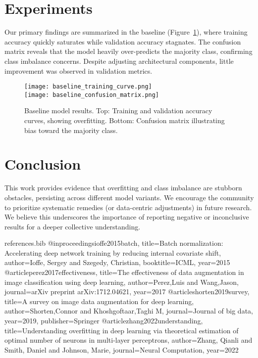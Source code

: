\documentclass{article}
\begin{document}
\section{Experiments}
Our primary findings are summarized in the baseline (Figure~\ref{fig:baseline}), where training accuracy quickly saturates while validation accuracy stagnates.
The confusion matrix reveals that the model heavily over-predicts the majority class, confirming class imbalance concerns.
Despite adjusting architectural components, little improvement was observed in validation metrics.

\begin{figure}[t]
  \centering
  \texttt{[image: baseline\_training\_curve.png]}\\
  \texttt{[image: baseline\_confusion\_matrix.png]}
  \caption{Baseline model results. Top: Training and validation accuracy curves, showing overfitting. Bottom: Confusion matrix illustrating bias toward the majority class.}
  \label{fig:baseline}
\end{figure}

\section{Conclusion}
This work provides evidence that overfitting and class imbalance are stubborn obstacles, persisting across different model variants.
We encourage the community to prioritize systematic remedies (or data-centric adjustments) in future research.
We believe this underscores the importance of reporting negative or inconclusive results for a deeper collective understanding.


\begin{filecontents}{references.bib}
@inproceedings{ioffe2015batch,
  title={Batch normalization: Accelerating deep network training by reducing internal covariate shift},
  author={Ioffe, Sergey and Szegedy, Christian},
  booktitle={ICML},
  year={2015}
}
@article{perez2017effectiveness,
  title={The effectiveness of data augmentation in image classification using deep learning},
  author={Perez,Luis and Wang,Jason},
  journal={arXiv preprint arXiv:1712.04621},
  year={2017}
}
@article{shorten2019survey,
  title={A survey on image data augmentation for deep learning},
  author={Shorten,Connor and Khoshgoftaar,Taghi M},
  journal={Journal of big data},
  year={2019},
  publisher={Springer}
}
@article{zhang2022understanding,
  title={Understanding overfitting in deep learning via theoretical estimation of optimal number of neurons in multi-layer perceptrons},
  author={Zhang, Qianli and Smith, Daniel and Johnson, Marie},
  journal={Neural Computation},
  year={2022}
}
\end{filecontents}
\end{document}

